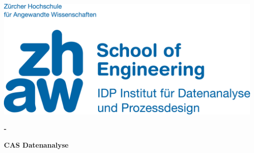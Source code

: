 \noindent
\begin{minipage}[t]{0.4\textwidth} 
\includegraphics[width=\linewidth]{logo.jpg}
\end{minipage}%
\hfill%
\begin{minipage}[t]{0.4\textwidth}\raggedleft
\textbf{\large \the\year-\the\month}
\end{minipage}

\begin{center}
 \textbf{\large CAS Datenanalyse} \\
 \vspace{0.3cm}
\end{center}
